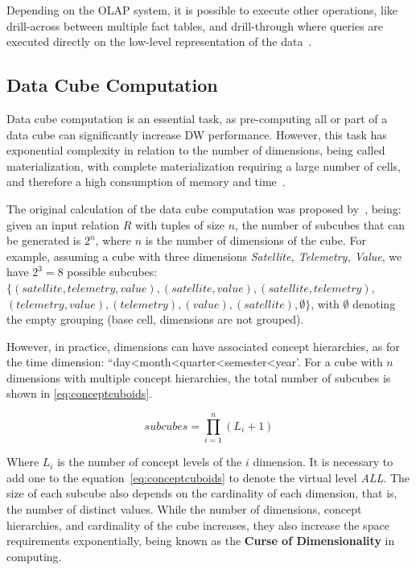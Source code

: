 Depending on the OLAP system, it is possible to execute other operations, like drill-across between multiple fact tables, and drill-through where queries are executed directly on the low-level representation of the data~\cite{hanDataMiningConcepts2011}.

\subsection{Data Cube Computation}\label{ch:fun:cube:comp}

Data cube computation is an essential task, as pre-computing all or part of a data cube can significantly increase DW performance.
However, this task has exponential complexity in relation to the number of dimensions, being called materialization, with complete materialization requiring a large number of cells, and therefore a high consumption of memory and time~\cite{hanDataMiningConcepts2011}.

The original calculation of the data cube computation was proposed by~, being: given an input relation $R$ with tuples of size $n$, the number of subcubes that can be generated is $2^n$, where $n$ is the number of dimensions of the cube.
For example, assuming a cube with three dimensions \textit{Satellite, Telemetry, Value}, we have $2^3 = 8$ possible subcubes: $\{(satellite, telemetry, value), (satellite, value), (satellite, telemetry),$ $(telemetry, value), (telemetry), (value), (satellite), \emptyset \}$, with $\emptyset$ denoting the empty grouping (base cell, dimensions are not grouped).

However, in practice, dimensions can have associated concept hierarchies, as for the time dimension: ``day<month<quarter<semester<year'.
For a cube with $n$ dimensions with multiple concept hierarchies, the total number of subcubes is shown in \autoref{eq:conceptcuboids}.

\begin{equation}
  subcubes = \prod_{i=1}^n (L_i + 1)
\label{eq:conceptcuboids}
\end{equation}

Where $L_i$ is the number of concept levels of the $i$ dimension.
It is necessary to add one to the equation~\ref{eq:conceptcuboids} to denote the virtual level \textit{ALL}.
The size of each subcube also depends on the cardinality of each dimension, that is, the number of distinct values.
While the number of dimensions, concept hierarchies, and cardinality of the cube increases, they also increase the space requirements exponentially, being known as the \textbf{Curse of Dimensionality} in computing.


